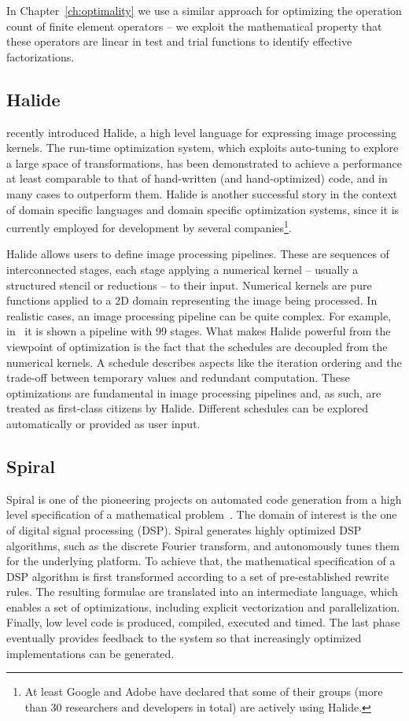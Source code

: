 In Chapter~\ref{ch:optimality} we use a similar approach for optimizing the operation count of finite element operators -- we exploit the mathematical property that these operators are linear in test and trial functions to identify effective factorizations.


\subsection{Halide}
\cite{Halide} recently introduced Halide, a high level language for expressing image processing kernels. The run-time optimization system, which exploits auto-tuning to explore a large space of transformations, has been demonstrated to achieve a performance at least comparable to that of hand-written (and hand-optimized) code, and in many cases to outperform them. Halide is another successful story in the context of domain specific languages and domain specific optimization systems, since it is currently employed for development by several companies\footnote{At least Google and Adobe have declared that some of their groups (more than 30 researchers and developers in total) are actively using Halide.}.

Halide allows users to define image processing pipelines. These are sequences of interconnected stages, each stage applying a numerical kernel -- usually a structured stencil or reductions -- to their input. Numerical kernels are pure functions applied to a 2D domain representing the image being processed. In realistic cases, an image processing pipeline can be quite complex. For example, in~\cite{halide-locallaplacian} it is shown a pipeline with 99 stages. What makes Halide powerful from the viewpoint of optimization is the fact that the schedules are decoupled from the numerical kernels. A schedule describes aspects like the iteration ordering and the trade-off between temporary values and redundant computation. These optimizations are fundamental in image processing pipelines and, as such, are treated as first-class citizens by Halide. Different schedules can be explored automatically or provided as user input.


\subsection{Spiral}
Spiral is one of the pioneering projects on automated code generation from a high level specification of a mathematical problem~\cite{Pueschel:05}. The domain of interest is the one of digital signal processing (DSP). Spiral generates highly optimized DSP algorithms, such as the discrete Fourier transform, and autonomously tunes them for the underlying platform. To achieve that, the mathematical specification of a DSP algorithm is first transformed according to a set of pre-established rewrite rules. The resulting formulae are translated into an intermediate language, which enables a set of optimizations, including explicit vectorization and parallelization. Finally, low level code is produced, compiled, executed and timed. The last phase eventually provides feedback to the system so that increasingly optimized implementations can be generated. 

